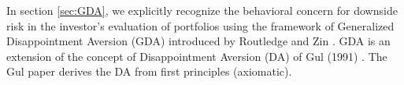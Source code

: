 \documentclass{article}
\begin{document}
In section \ref{sec:GDA}, we explicitly recognize the behavioral
concern for downside risk in the investor's evaluation of portfolios
using the framework of Generalized Disappointment Aversion (GDA)
introduced by Routledge and Zin \cite{routledge2010generalized}. GDA
is an extension of the concept of Disappointment Aversion (DA) of Gul
(1991) \cite{gul1991theory}. The Gul paper derives the DA from first
principles (axiomatic).


\end{document}
